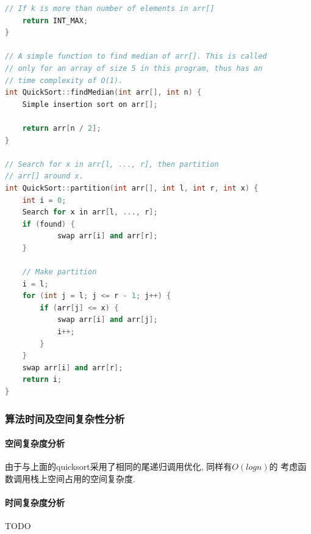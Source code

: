 \begin{lstlisting}[language=c++]
    // If k is more than number of elements in arr[]
    return INT_MAX;
}

// A simple function to find median of arr[]. This is called
// only for an array of size 5 in this program, thus has an
// time complexity of O(1).
int QuickSort::findMedian(int arr[], int n) {
  	Simple insertion sort on arr[];

    return arr[n / 2];
}

// Search for x in arr[l, ..., r], then partition
// arr[] around x.
int QuickSort::partition(int arr[], int l, int r, int x) {
    int i = 0;
    Search for x in arr[l, ..., r];
    if (found) {
			swap arr[i] and arr[r];
    }

    // Make partition
    i = l;
    for (int j = l; j <= r - 1; j++) {
        if (arr[j] <= x) {
            swap arr[i] and arr[j];
            i++;
        }
    }
  	swap arr[i] and arr[r];
    return i;
}
\end{lstlisting}

\subsubsection{算法时间及空间复杂性分析}
\paragraph{空间复杂度分析}
由于与上面的quicksort采用了相同的尾递归调用优化, 同样有$O(log{n})$的
考虑函数调用栈上空间占用的空间复杂度.

\paragraph{时间复杂度分析}
TODO
